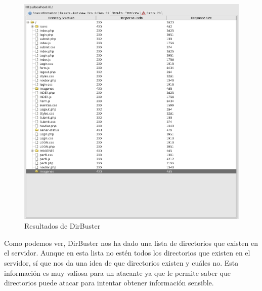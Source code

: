 \documentclass{report}
\begin{document}
                \begin{figure}[H]
                    \centering
                    \includegraphics[width=1\textwidth]{./img/vulnerabilidades/2.4/2.2.png}
                    \caption{Resultados de DirBuster}
                \end{figure}
                Como podemos ver, DirBuster nos ha dado una lista de directorios que existen en el servidor.
                Aunque en esta lista no estén todos los directorios que existen en el servidor, sí que nos da una idea de que directorios existen y cuáles no.
                Esta información es muy valiosa para un atacante ya que le permite saber que directorios puede atacar para intentar obtener información sensible.\\
            \clearpage
\end{document}
